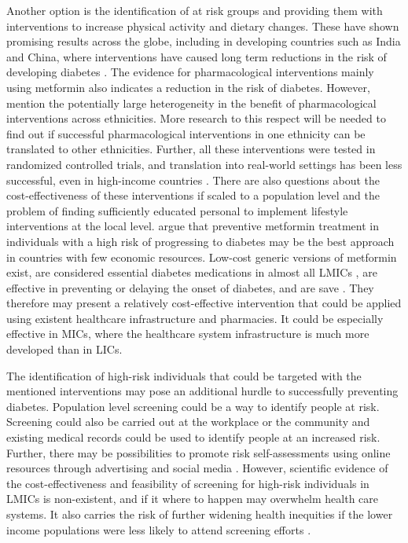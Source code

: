 Another option is the identification of at risk groups and providing them with interventions to increase physical activity and dietary changes. These have shown promising results across the globe, including in developing countries such as India and China, where interventions have caused long term reductions in the risk of developing diabetes \parencite{Cefalu2016}. The evidence for pharmacological interventions mainly using metformin also indicates a reduction in the risk of diabetes. However, \textcite{Cefalu2016} mention the potentially large heterogeneity in the benefit of pharmacological interventions across ethnicities. More research to this respect will be needed to find out if successful pharmacological interventions in one ethnicity can be translated to other ethnicities. Further, all these interventions were tested in randomized controlled trials, and translation into real-world settings has been less successful, even in high-income countries \parencite{Wareham2016}. There are also questions about the cost-effectiveness of these interventions if scaled to a population level and the problem of finding sufficiently educated personal to implement lifestyle interventions at the local level. \textcite{Cefalu2016} argue that preventive metformin treatment in individuals with a high risk of progressing to diabetes may be the best approach in countries with few economic resources. Low-cost generic versions of metformin exist, are considered essential diabetes medications in almost all \acp{LMIC} \parencite{Bazargani2014}, are effective in preventing or delaying the onset of diabetes, and are save \parencite{Gomes2013}. They therefore may present a relatively cost-effective intervention that could be applied using existent healthcare infrastructure and pharmacies. It could be especially effective in \acp{MIC}, where the healthcare system infrastructure is much more developed than in \acp{LIC}.

The identification of high-risk individuals that could be targeted with the mentioned interventions may pose an additional hurdle to successfully preventing diabetes. Population level screening could be a way to identify people at risk. Screening could also be carried out at the workplace or the community and existing medical records could be used to identify people at an increased risk. Further, there may be possibilities to promote risk self-assessments using online resources through advertising and social media \parencite{Cefalu2016}. However, scientific evidence of the cost-effectiveness and feasibility of screening for high-risk individuals in \acp{LMIC} is non-existent, and if it where to happen may overwhelm health care systems. It also carries the risk of further widening health inequities if the lower income populations were less likely to attend screening efforts \parencite{Wareham2016}.


